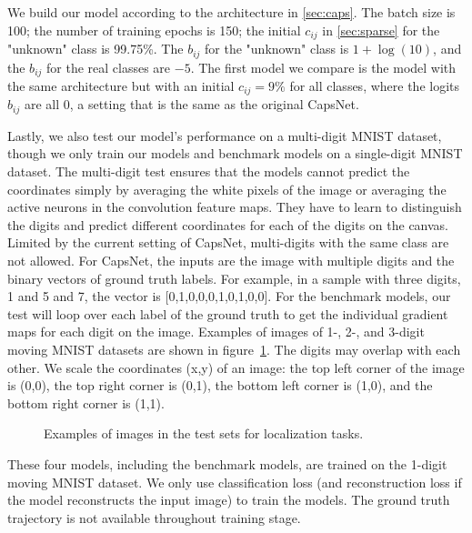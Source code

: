 \documentclass{article}
\begin{document}
We build our model according to the architecture in \autoref{sec:caps}. The batch size is 100; the number of training epochs is 150; the initial $c_{ij}$ in \autoref{sec:sparse} for the "unknown" class is 99.75\%. The $b_{ij}$ for the "unknown" class is $1+\log(10)$, and the $b_{ij}$ for the real classes are $-5$. The first model we compare is the model with the same architecture but with an initial $c_{ij} = 9\%$ for all classes, where the logits $b_{ij}$ are all 0, a setting that is the same as the original CapsNet. 

Lastly, we also test our model's performance on a multi-digit MNIST dataset, though we only train our models and benchmark models on a single-digit MNIST dataset. The multi-digit test ensures that the models cannot predict the coordinates simply by averaging the white pixels of the image or averaging the active neurons in the convolution feature maps. They have to learn to distinguish the digits and predict different coordinates for each of the digits on the canvas. Limited by the current setting of CapsNet, multi-digits with the same class are not allowed. For CapsNet, the inputs are the image with multiple digits and the binary vectors of ground truth labels. For example, in a sample with three digits, 1 and 5 and 7, the vector is [0,1,0,0,0,1,0,1,0,0]. For the benchmark models, our test will loop over each label of the ground truth to get the individual gradient maps for each digit on the image. Examples of images of 1-, 2-, and 3-digit moving MNIST datasets are shown in figure~\ref{fig:ex}. The digits may overlap with each other. We scale the coordinates (x,y) of an image: the top left corner of the image is (0,0), the top right corner is (0,1), the bottom left corner is (1,0), and the bottom right corner is (1,1). 

\begin{figure}
\centering
{}
\caption{Examples of images in the test sets for localization tasks. \label{fig:ex}}
\end{figure}

These four models, including the benchmark models, are trained on the 1-digit moving MNIST dataset. We only use classification loss (and reconstruction loss if the model reconstructs the input image) to train the models. The ground truth trajectory is not available throughout training stage. 
\end{document}
